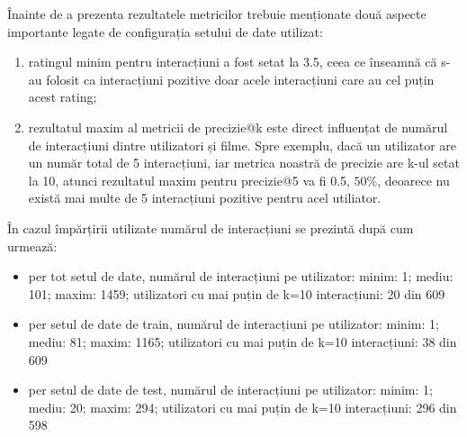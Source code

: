 Înainte de a prezenta rezultatele metricilor trebuie menționate două aspecte importante legate de configurația setului de date utilizat:
\begin{enumerate}
	\item ratingul minim pentru interacțiuni a fost setat la 3.5, ceea ce înseamnă că s-au folosit ca interacțiuni pozitive doar acele interacțiuni care au cel puțin acest rating;
	\item rezultatul maxim al metricii de precizie@k este direct influențat de numărul de interacțiuni dintre utilizatori și filme. Spre exemplu, dacă un utilizator are un număr total de 5 interacțiuni, iar metrica noastră de precizie are k-ul setat la 10, atunci rezultatul maxim pentru precizie@5 va fi 0.5, $50\%$, deoarece nu există mai multe de 5 interacțiuni pozitive pentru acel utiliator.
\end{enumerate}

În cazul împărțirii utilizate numărul de interacțiuni se prezintă după cum urmează:
\begin{itemize}
	\item per tot setul de date, numărul de interacțiuni pe utilizator: minim: 1; mediu: 101; maxim: 1459; utilizatori cu mai puțin de k=10 interacțiuni: 20 din 609 
	\item per setul de date de train, numărul de interacțiuni pe utilizator: minim: 1; mediu: 81; maxim: 1165; utilizatori cu mai puțin de k=10 interacțiuni: 38 din 609
	\item per setul de date de test, numărul de interacțiuni pe utilizator: minim: 1; mediu: 20; maxim: 294; utilizatori cu mai puțin de k=10 interacțiuni: 296 din 598
\end{itemize}

